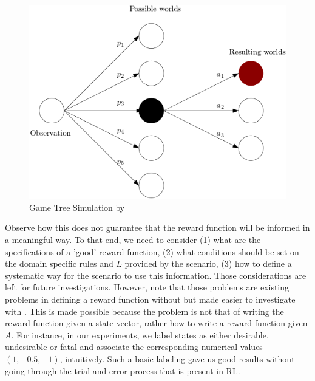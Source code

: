 \begin{figure}[H]
  \centering
  \includegraphics[scale=0.5]{figures/scworlds.png}
  \caption{Game Tree Simulation by \dio{}}
  \label{fig:diosim}
\end{figure}

Observe how this does not guarantee that the reward function will be informed in a meaningful way.
To that end, we need to consider (1) what are the specifications of a 'good' reward function, (2) what conditions should be set 
on the domain specific rules and $L$ provided by the scenario, (3) how to define a systematic way for the scenario to use 
this information. Those considerations are left for future
investigations. However, note that those problems are existing problems in defining a reward function 
without \dio{} but made easier to investigate with \dio{}. This is made possible because the problem 
is not that of writing the reward function given a state vector, rather how to write a reward function given 
$A$. For instance, in our experiments, we label states as either desirable, undesirable or fatal and associate 
the corresponding numerical values $(1,-0.5, -1)$, intuitively. Such a basic labeling gave us good results without 
going through the trial-and-error process that is present in RL. 
